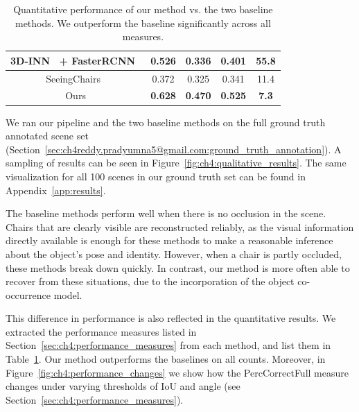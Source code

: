 \documentclass[10pt,twocolumn,letterpaper]{article}
\begin{document}
\begin{table}[h!]
{\begin{tabular}{|c|c|c|c|c|}
        3D-INN~\cite{Wu:2016:ECCV} + FasterRCNN~\cite{Ren:2015:NIPS}  & 0.526                   & 0.336                & 0.401            & 55.8                   \\ \hline
        SeeingChairs~\cite{Aubry:2014:CVPR}                           & 0.372                   & 0.325                & 0.341            & 11.4                   \\ \hline
        Ours                                                          & \textbf{0.628}          & \textbf{0.470}       & \textbf{0.525}   & \textbf{7.3}           \\ \hline

        \end{tabular}
    }
    \caption[Quantitative performance]{Quantitative performance of our method vs. the two baseline methods. We outperform the baseline significantly across all measures.}
    \label{tab:ch4:performance}
\end{table}
We ran our pipeline and the two baseline methods on the full ground truth
annotated scene set (Section~\ref{sec:ch4reddy.pradyumna5@gmail.com:ground_truth_annotation}). A sampling
of results can be seen in Figure~\ref{fig:ch4:qualitative_results}. The same visualization
for all 100 scenes in our ground truth set can be found in Appendix~\ref{app:results}.

The baseline methods perform well when there is no occlusion in the scene.
Chairs that are clearly visible are reconstructed reliably, as the visual
information directly available is enough for these methods to make a reasonable
inference about the object's pose and identity. However, when a chair is partly
occluded, these methods break down quickly. In contrast, our method is more
often able to recover from these situations, due to the incorporation of the
object co-occurrence model. 

This difference in performance is also reflected in the quantitative results. We
extracted the performance measures listed in
Section~\ref{sec:ch4:performance_measures} from each method, and list them in
Table~\ref{tab:ch4:performance}. Our method outperforms the baselines on all
counts.  Moreover, in Figure~\ref{fig:ch4:performance_changes} we show how the
PercCorrectFull measure changes under varying thresholds of IoU and angle (see
Section~\ref{sec:ch4:performance_measures}).
\end{document}
